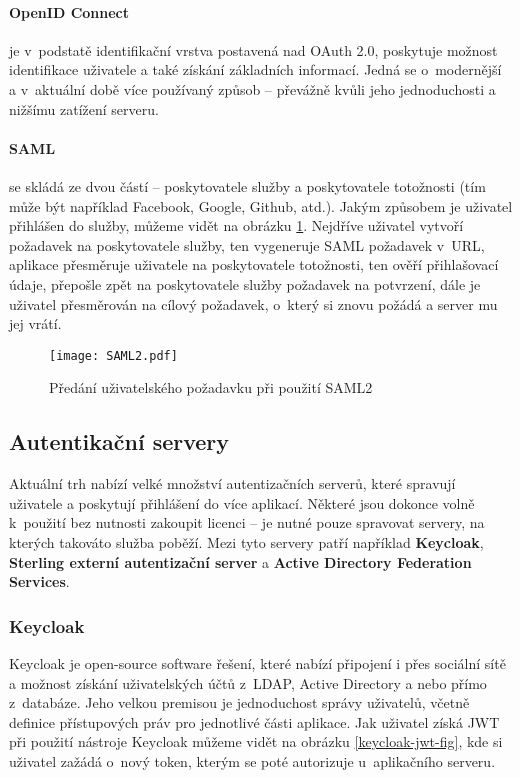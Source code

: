 \paragraph{OpenID Connect} je v~podstatě identifikační vrstva postavená nad OAuth 2.0, poskytuje možnost identifikace uživatele a také získání základních informací. Jedná se o~modernější a v~aktuální době více používaný způsob -- převážně kvůli jeho jednoduchosti a nižšímu zatížení serveru. \cite{oidc}

\paragraph{SAML} se skládá ze dvou částí -- poskytovatele služby a poskytovatele totožnosti (tím může být například Facebook, Google, Github, atd.). Jakým způsobem je uživatel přihlášen do služby, můžeme vidět na obrázku \ref{saml2}. Nejdříve uživatel vytvoří požadavek na poskytovatele služby, ten vygeneruje SAML požadavek v~URL, aplikace přesměruje uživatele na poskytovatele totožnosti, ten ověří přihlašovací údaje, přepošle zpět na poskytovatele služby požadavek na potvrzení, dále je uživatel přesměrován na cílový požadavek, o~který si znovu požádá a server mu jej vrátí. \cite{saml}
\begin{figure}[!htp]
\centering
\texttt{[image: SAML2.pdf]}
\caption{Předání uživatelského požadavku při použití SAML2}
\label{saml2}
\end{figure}
\newpage
\subsection{Autentikační servery} \label{auth-server}
\par Aktuální trh nabízí velké množství autentizačních serverů, které spravují uživatele a poskytují přihlášení do více aplikací. Některé jsou dokonce volně k~použití bez nutnosti zakoupit licenci -- je nutné pouze spravovat servery, na kterých takováto služba poběží. Mezi tyto servery patří například \textbf{Keycloak}, \textbf{Sterling externí autentizační server} a \textbf{Active Directory Federation Services}.

\subsubsection{Keycloak} 
\par Keycloak je open-source software řešení, které nabízí připojení i přes sociální sítě a možnost získání uživatelských účtů z~LDAP, Active Directory a nebo přímo z~databáze. Jeho velkou premisou je jednoduchost správy uživatelů, včetně definice přístupových práv pro jednotlivé části aplikace. \cite{keycloak} Jak uživatel získá JWT při použití nástroje Keycloak můžeme vidět na obrázku \ref{keycloak-jwt-fig}, kde si uživatel zažádá o~nový token, kterým se poté autorizuje u~aplikačního serveru.

